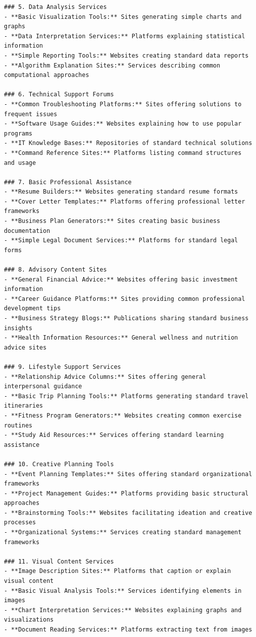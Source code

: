 \documentclass[12pt]{article}
\begin{document}
{\begin{verbatim}
### 5. Data Analysis Services
- **Basic Visualization Tools:** Sites generating simple charts and graphs
- **Data Interpretation Services:** Platforms explaining statistical information
- **Simple Reporting Tools:** Websites creating standard data reports
- **Algorithm Explanation Sites:** Services describing common computational approaches

### 6. Technical Support Forums
- **Common Troubleshooting Platforms:** Sites offering solutions to frequent issues
- **Software Usage Guides:** Websites explaining how to use popular programs
- **IT Knowledge Bases:** Repositories of standard technical solutions
- **Command Reference Sites:** Platforms listing command structures and usage

### 7. Basic Professional Assistance
- **Resume Builders:** Websites generating standard resume formats
- **Cover Letter Templates:** Platforms offering professional letter frameworks
- **Business Plan Generators:** Sites creating basic business documentation
- **Simple Legal Document Services:** Platforms for standard legal forms

### 8. Advisory Content Sites
- **General Financial Advice:** Websites offering basic investment information
- **Career Guidance Platforms:** Sites providing common professional development tips
- **Business Strategy Blogs:** Publications sharing standard business insights
- **Health Information Resources:** General wellness and nutrition advice sites

### 9. Lifestyle Support Services
- **Relationship Advice Columns:** Sites offering general interpersonal guidance
- **Basic Trip Planning Tools:** Platforms generating standard travel itineraries
- **Fitness Program Generators:** Websites creating common exercise routines
- **Study Aid Resources:** Services offering standard learning assistance

### 10. Creative Planning Tools
- **Event Planning Templates:** Sites offering standard organizational frameworks
- **Project Management Guides:** Platforms providing basic structural approaches
- **Brainstorming Tools:** Websites facilitating ideation and creative processes
- **Organizational Systems:** Services creating standard management frameworks

### 11. Visual Content Services
- **Image Description Sites:** Platforms that caption or explain visual content
- **Basic Visual Analysis Tools:** Services identifying elements in images
- **Chart Interpretation Services:** Websites explaining graphs and visualizations
- **Document Reading Services:** Platforms extracting text from images


\end{verbatim}}
\end{document}
